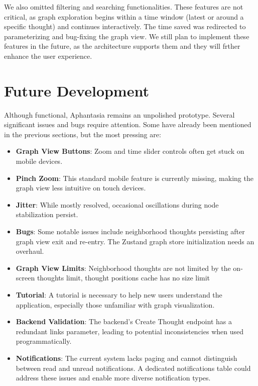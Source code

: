We also omitted filtering and searching functionalities.
These features are not critical, as graph exploration begins within a time window (latest or around a specific thought) and continues interactively.
The time saved was redirected to parameterizing and bug-fixing the graph view.
We still plan to implement these features in the future, as the architecture supports them and they will frther enhance the user experience.

\section{Future Development}

Although functional, Aphantasia remains an unpolished prototype.
Several significant issues and bugs require attention.
Some have already been mentioned in the previous sections, but the most pressing are:

\begin{itemize}
\item \textbf{Graph View Buttons}: Zoom and time slider controls often get stuck on mobile devices.
\item \textbf{Pinch Zoom}: This standard mobile feature is currently missing, making the graph view less intuitive on touch devices.
\item \textbf{Jitter}: While mostly resolved, occasional oscillations during node stabilization persist.
\item \textbf{Bugs}: Some notable issues include neighborhood thoughts persisting after graph view exit and re-entry. The Zustand graph store initialization needs an overhaul.
\item \textbf{Graph View Limits}: Neighborhood thoughts are not limited by the on-screen thoughts limit, thought positions cache has no size limit 
\item \textbf{Tutorial}: A tutorial is necessary to help new users understand the application, especially those unfamiliar with graph visualization.
\item \textbf{Backend Validation}: The backend’s Create Thought endpoint has a redundant links parameter, leading to potential inconsistencies when used programmatically.
\item \textbf{Notifications}: The current system lacks paging and cannot distinguish between read and unread notifications.
A dedicated notifications table could address these issues and enable more diverse notification types.
\end{itemize}

